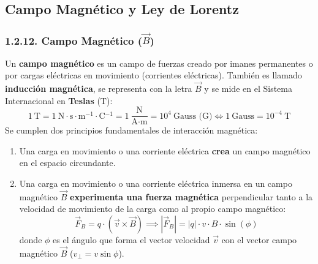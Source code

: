 \subsection{Campo Magnético y Ley de Lorentz}

\subsubsection{1.2.12. Campo Magnético ($\vec{B}$)}
Un \textbf{campo magnético} es un campo de fuerzas creado por imanes permanentes o por cargas eléctricas en movimiento (corrientes eléctricas). También es llamado \textbf{inducción magnética}, se representa con la letra $\vec{B}$ y se mide en el Sistema Internacional en \textbf{Teslas} ($\si{\tesla}$):
\begin{equation}
    1\ \si{\tesla} = 1\ \si{\newton\cdot\second\cdot\meter^{-1}\cdot\coulomb^{-1}} = 1\ \frac{\si{\newton}}{\si{\ampere\cdot\meter}} = 10^4\ \text{Gauss (G)} \iff 1\ \text{Gauss} = 10^{-4}\ \si{\tesla}
\end{equation}
Se cumplen dos principios fundamentales de interacción magnética:
\begin{enumerate}[leftmargin=*]
    \item Una carga en movimiento o una corriente eléctrica \textbf{crea} un campo magnético en el espacio circundante.
    \item Una carga en movimiento o una corriente eléctrica inmersa en un campo magnético $\vec{B}$ \textbf{experimenta una fuerza magnética} perpendicular tanto a la velocidad de movimiento de la carga como al propio campo magnético:
    \begin{equation}
        \vec{F}_B = q \cdot (\vec{v} \times \vec{B}) \implies |\vec{F}_B| = |q| \cdot v \cdot B \cdot \sin(\phi)
    \end{equation}
    donde $\phi$ es el ángulo que forma el vector velocidad $\vec{v}$ con el vector campo magnético $\vec{B}$ ($v_\perp = v\sin\phi$).
\end{enumerate}

